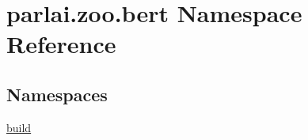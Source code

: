 \hypertarget{namespaceparlai_1_1zoo_1_1bert}{}\section{parlai.\+zoo.\+bert Namespace Reference}
\label{namespaceparlai_1_1zoo_1_1bert}
\subsection*{Namespaces}
\begin{DoxyCompactItemize}
\item 
 \hyperlink{namespaceparlai_1_1zoo_1_1bert_1_1build}{build}
\end{DoxyCompactItemize}
